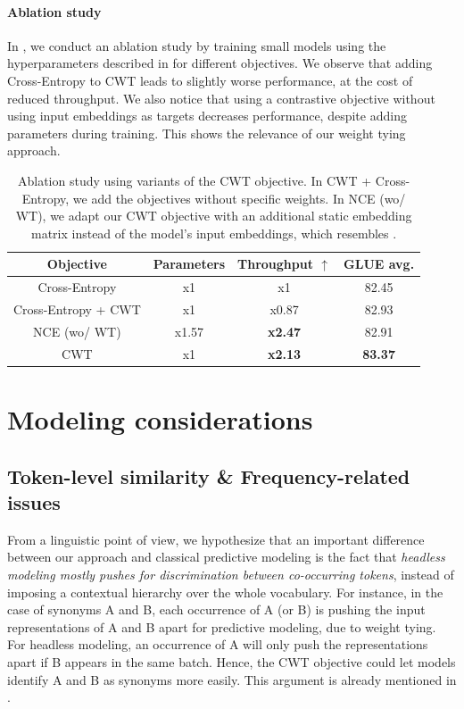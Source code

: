 \paragraph{Ablation study}

In , we conduct an ablation study by training small models using the hyperparameters described in  for different objectives. We observe that adding Cross-Entropy to CWT leads to slightly worse performance, at the cost of reduced throughput. We also notice that using a contrastive objective without using input embeddings as targets decreases performance, despite adding parameters during training. This shows the relevance of our weight tying approach.

\begin{table}[h]
\centering \small
\begin{tabular}{@{}cccc@{}}
\toprule
Objective           & Parameters & Throughput $\uparrow$     & GLUE avg.      \\ \midrule
Cross-Entropy       & x1        & x1             & 82.45          \\
Cross-Entropy + CWT & x1        & x0.87          & 82.93          \\
NCE (wo/ WT)        & x1.57        & \textbf{x2.47} & 82.91          \\
CWT                 & x1        & \textbf{x2.13} & \textbf{83.37} \\ \bottomrule
\end{tabular}
\caption{Ablation study using variants of the CWT objective. In CWT + Cross-Entropy, we add the objectives without specific weights. In NCE (wo/ WT), we adapt our CWT objective with an additional static embedding matrix instead of the model's input embeddings, which resembles \citet{ma-collins-2018-noise}.}
\label{tab:ablation}
\end{table}

\section{Modeling considerations} 
\subsection{Token-level similarity \& Frequency-related issues}
From a linguistic point of view, we hypothesize that an important difference between our approach and classical predictive modeling is the fact that \textit{headless modeling mostly pushes for discrimination between co-occurring tokens}, instead of imposing a contextual hierarchy over the whole vocabulary. For instance, in the case of synonyms A and B, each occurrence of A (or B) is pushing the input representations of A and B apart for predictive modeling, due to weight tying. For headless modeling, an occurrence of A will only push the representations apart if B appears in the same batch. Hence, the CWT objective could let models identify A and B as synonyms more easily. This argument is already mentioned in \citet{jean-etal-2015-using}.

